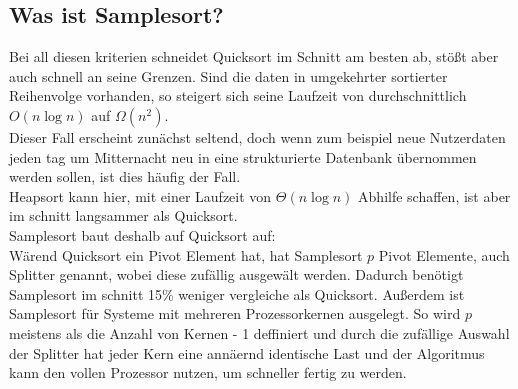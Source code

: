     \subsection{Was ist Samplesort?}
    Bei all diesen kriterien schneidet Quicksort im Schnitt am besten ab, stößt aber auch schnell an seine Grenzen. Sind die daten in umgekehrter sortierter Reihenvolge vorhanden, so steigert sich seine Laufzeit von durchschnittlich $O(n\log{n})$ auf $\Omega(n^2)$.\\
    Dieser Fall erscheint zunächst seltend, doch wenn zum beispiel neue Nutzerdaten jeden tag um Mitternacht neu in eine strukturierte Datenbank übernommen werden sollen, ist dies häufig der Fall.\\
    Heapsort kann hier, mit einer Laufzeit von $\Theta(n\log{n})$ Abhilfe schaffen, ist aber im schnitt langsammer als Quicksort.\\
    Samplesort baut deshalb auf Quicksort auf:\\
    W\"arend Quicksort ein Pivot Element hat, hat Samplesort $p$ Pivot Elemente, auch Splitter genannt, wobei diese zuf\"allig ausgew\"alt werden.
    Dadurch ben\"otigt Samplesort im schnitt 15\% weniger vergleiche als Quicksort. \autocite{frazer-1970}
    Außerdem ist Samplesort f\"ur Systeme mit mehreren Prozessorkernen ausgelegt.
    So wird $p$ meistens als die Anzahl von Kernen - 1 deffiniert und durch die zuf\"allige Auswahl der Splitter hat jeder Kern eine ann\"aernd identische Last und der Algoritmus kann den vollen Prozessor nutzen, um schneller fertig zu werden.
    
